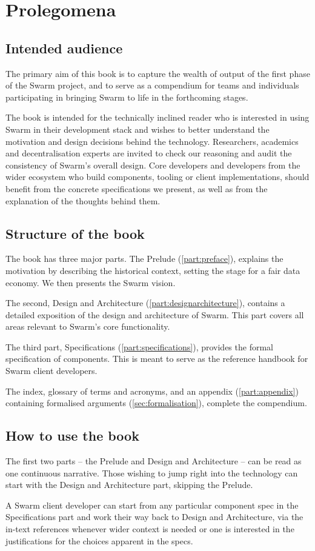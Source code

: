 \chapter{Prolegomena \statusgreen}
\green{}
\section*{Intended audience \statusgreen}
The primary aim of this book is to capture the wealth of output of the first phase of the Swarm project, and to serve as a compendium for teams and individuals participating in bringing Swarm to life in the forthcoming stages.

The book is intended for the technically inclined reader who is interested in using Swarm in their development stack and wishes to better understand the motivation and design decisions behind the technology. Researchers, academics and decentralisation experts are invited to check our reasoning and audit the consistency of Swarm's overall design. Core developers and developers from the wider ecosystem who build components, tooling or client implementations, should benefit from the concrete specifications we present, as well as from the explanation of the thoughts behind them.

\section*{Structure of the book \statusgreen}

The book has three major parts. The Prelude (\ref{part:preface}), explains the motivation by describing the historical context, setting the stage for a fair data economy. We then presents the Swarm vision.

The second, Design and Architecture (\ref{part:designarchitecture}), contains a detailed exposition of the design and architecture of Swarm. This part covers all areas relevant to Swarm's core functionality.

The third part, Specifications (\ref{part:specifications}), provides the formal specification of components. This is meant to serve as the reference handbook for Swarm client developers.

The index, glossary of terms and acronyms, and an appendix (\ref{part:appendix}) containing formalised arguments (\ref{sec:formalisation}), complete the compendium.

\section*{How to use the book \statusgreen}

The first two parts – the Prelude and  Design and Architecture – can be read as one continuous narrative. Those wishing to jump right into the technology can start with the Design and Architecture part, skipping the Prelude.

A Swarm client developer can start from any particular component spec in the Specifications part and work their way back to Design and Architecture, via the in-text references whenever wider context is needed or one is interested in the justifications for the choices apparent in the specs.
